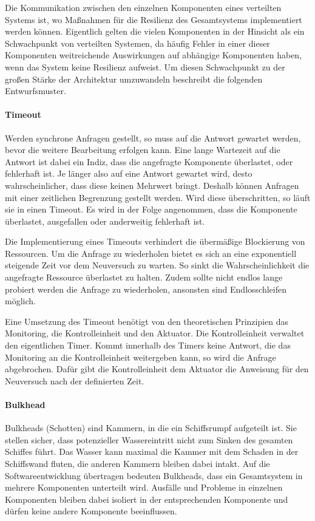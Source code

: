 \documentclass[]{lni}
\begin{document}
Die Kommunikation zwischen den einzelnen Komponenten eines verteilten Systems ist, wo Maßnahmen für die Resilienz des Gesamtsystems implementiert werden können.
Eigentlich gelten die vielen Komponenten in der Hinsicht als ein Schwachpunkt von verteilten Systemen, da häufig Fehler in einer dieser Komponenten weitreichende Auswirkungen auf abhängige Komponenten haben, wenn das System keine Resilienz aufweist.
Um diesen Schwachpunkt zu der großen Stärke der Architektur umzuwandeln beschreibt \cite{Wolff.2016} die folgenden Entwurfsmuster.

\paragraph{Timeout}
Werden synchrone Anfragen gestellt, so muss auf die Antwort gewartet werden, bevor die weitere Bearbeitung erfolgen kann.
Eine lange Wartezeit auf die Antwort ist dabei ein Indiz, dass die angefragte Komponente überlastet, oder fehlerhaft ist. 
Je länger also auf eine Antwort gewartet wird, desto wahrscheinlicher, dass diese keinen Mehrwert bringt.
Deshalb können Anfragen mit einer zeitlichen Begrenzung gestellt werden. 
Wird diese überschritten, so läuft sie in einen Timeout. 
Es wird in der Folge angenommen, dass die Komponente überlastet, ausgefallen oder anderweitig fehlerhaft ist.

Die Implementierung eines Timeouts verhindert die übermäßige Blockierung von Ressourcen.
Um die Anfrage zu wiederholen bietet es sich an eine exponentiell steigende Zeit vor dem Neuversuch zu warten.
So sinkt die Wahrscheinlichkeit die angefragte Ressource überlastet zu halten.
Zudem sollte nicht endlos lange probiert werden die Anfrage zu wiederholen, ansonsten sind Endlosschleifen möglich.

Eine Umsetzung des Timeout benötigt von den theoretischen Prinzipien das Monitoring, die Kontrolleinheit und den Aktuator.
Die Kontrolleinheit verwaltet den eigentlichen Timer.
Kommt innerhalb des Timers keine Antwort, die das Monitoring an die Kontrolleinheit weitergeben kann, so wird die Anfrage abgebrochen.
Dafür gibt die Kontrolleinheit dem Aktuator die Anweisung für den Neuversuch nach der definierten Zeit.

\paragraph{Bulkhead}
Bulkheads (Schotten) sind Kammern, in die ein Schiffsrumpf aufgeteilt ist. 
Sie stellen sicher, dass potenzieller Wassereintritt nicht zum Sinken des gesamten Schiffes führt. 
Das Wasser kann maximal die Kammer mit dem Schaden in der Schiffswand fluten, die anderen Kammern bleiben dabei intakt.
Auf die Softwareentwicklung übertragen bedeuten Bulkheads, dass ein Gesamtsystem in mehrere Komponenten unterteilt wird.
Ausfälle und Probleme in einzelnen Komponenten bleiben dabei isoliert in der entsprechenden Komponente und dürfen keine andere Komponente beeinflussen.
\end{document}

